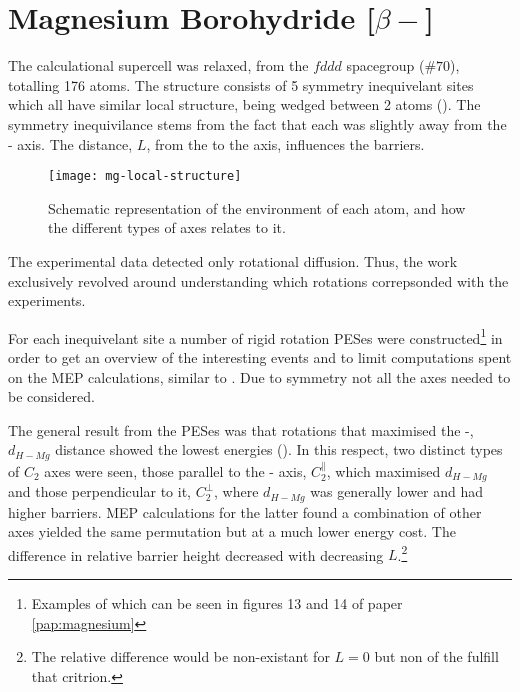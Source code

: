\section{Magnesium Borohydride [$\beta-$]}
\label{sec:borohydrides-magnesium}

The calculational supercell was relaxed, from the $fddd$ spacegroup ($\#70$), totalling 176 atoms.
The structure consists of 5 symmetry inequivelant  sites which all have similar local structure, being wedged between 2  atoms ().
The symmetry inequivilance stems from the fact that each  was slightly away from the - axis.
The distance, $L$, from the  to the axis, influences the barriers.

\begin{figure}
\begin{center}
    \texttt{[image: mg-local-structure]}
\caption{Schematic representation of the environment of each  atom, and how the different types of axes relates to it.
}
\label{fig:mg-local-structure}
\end{center}
\end{figure}

The experimental data detected only rotational diffusion.
Thus, the work exclusively revolved around understanding which rotations correpsonded with the experiments.

For each inequivelant site a number of rigid rotation PESes were constructed\footnote{Examples of which can be seen in figures 13 and 14 of paper \ref{pap:magnesium}} in order to get an overview of the interesting events and to limit computations spent on the MEP calculations, similar to .
Due to symmetry not all the axes needed to be considered.

The general result from the PESes was that rotations that maximised the -, $d_{H-Mg}$ distance showed the lowest energies ().
In this respect, two distinct types of $C_2$ axes were seen, those parallel to the - axis, $C_2^\parallel$, which maximised $d_{H-Mg}$ and those perpendicular to it, $C_2^\perp$, where $d_{H-Mg}$ was generally lower and had higher barriers.
MEP calculations for the latter found a combination of other axes yielded the same permutation but at a much lower energy cost.
The difference in relative barrier height decreased with decreasing $L$.\footnote{The relative difference would be non-existant for $L=0$ but non of the  fulfill that critrion.}

